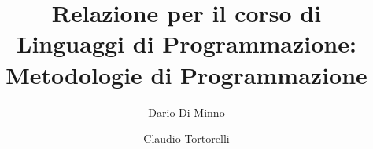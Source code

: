 \documentclass[a4paper,11pt,titlepage]{article}
\author{Dario Di Minno \and Claudio Tortorelli}
\begin{document}

\title{Relazione per il corso di \\ Linguaggi di Programmazione: \\ Metodologie di Programmazione}

\thispagestyle{empty}


\renewcommand{\sectionmark}[1]{\markright{\thesection\ #1}}

\fancyhf{} \fancyhead[LE,RO]{\bfseries\thepage}

\fancyhead[LO]{\bfseries\rightmark}

\fancyhead[RE]{\bfseries\leftmark}

\renewcommand{\headrulewidth}{0.5pt}

\addtolength{\headheight}{0.5pt}



\newcommand{\vect}[1]{\boldsymbol{#1}}



\maketitle 


\newpage


\tableofcontents %












\end{document}
